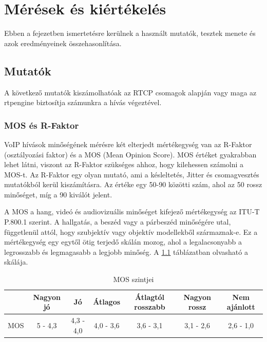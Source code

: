 \chapter{Mérések és kiértékelés}

Ebben a fejezetben ismertetésre kerülnek a használt mutatók, tesztek menete és
azok eredményeinek összehasonlítása.

\section{Mutatók}

A következő mutatók kiszámolhatóak az RTCP csomagok alapján vagy maga az rtpengine
biztosítja számunkra a hívás végeztével.

\subsection{MOS és R-Faktor}

VoIP hívások minőségének mérésre két elterjedt mértékegység van az R-Faktor (osztályozási faktor) és a MOS (Mean Opinion Score). MOS értéket gyakrabban lehet látni, viszont az R-Faktor szükséges ahhoz, hogy kilehessen számolni a MOS-t. Az R-Faktor egy olyan mutató, ami a késleltetés, Jitter és csomagvesztés mutatókból kerül kiszámításra. Az értéke egy 50-90 közötti szám, ahol az 50 rossz minőséget, míg a 90 kiválót jelent. 

A MOS a hang, videó és audiovizuális minőséget kifejező mértékegység az 
ITU-T P.800.1 szerint. A hallgatás, a beszéd vagy a párbeszéd minőségére utal, 
függetlenül attól, hogy szubjektív vagy objektív modellekből származnak-e. Ez a
mértékegység egy egytől ötig terjedő skálán mozog, ahol a legalacsonyabb a legrosszabb
és legmagasabb a legjobb minőség. A \ref{tab:mosValues} táblázatban olvasható a skálája. 

\begin{table}[ht]
	\footnotesize
	\centering
	\begin{tabular}{l c c c c c c}
		\toprule
		 & Nagyon jó & Jó & Átlagos & Átlagtól rosszabb & Nagyon rossz & Nem ajánlott\\
		\midrule
		MOS & 5 - 4,3 & 4,3 - 4,0 & 4,0 - 3,6 & 3,6 - 3,1 & 3,1 - 2,6 & 2,6 - 1,0\\
		\bottomrule
	\end{tabular}
	\caption{MOS szintjei}
	\label{tab:mosValues}
\end{table}

